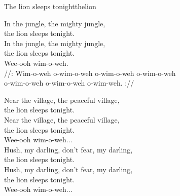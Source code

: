 \begin{song}{The lion sleeps tonight}{thelion}
\begin{vers}
In the jungle, the mighty jungle, \\
the lion sleeps tonight.\\
In the jungle, the mighty jungle, \\
the lion sleeps tonight.\\
Wee-ooh wim-o-weh.\\
//: Wim-o-weh o-wim-o-weh o-wim-o-weh o-wim-o-weh\\
o-wim-o-weh o-wim-o-weh o-wim-weh. ://\\
\end{vers}
\begin{vers}
Near the village, the peaceful village, \\
the lion sleeps tonight.\\
Near the village, the peaceful village, \\
the lion sleeps tonight.\\
Wee-ooh wim-o-weh...\\
Hush, my darling, don't fear, my darling, \\
the lion sleeps tonight.\\
Hush, my darling, don't fear, my darling, \\
the lion sleeps tonight.\\
Wee-ooh wim-o-weh...\\
\end{vers}
\end{song}

\newpage

